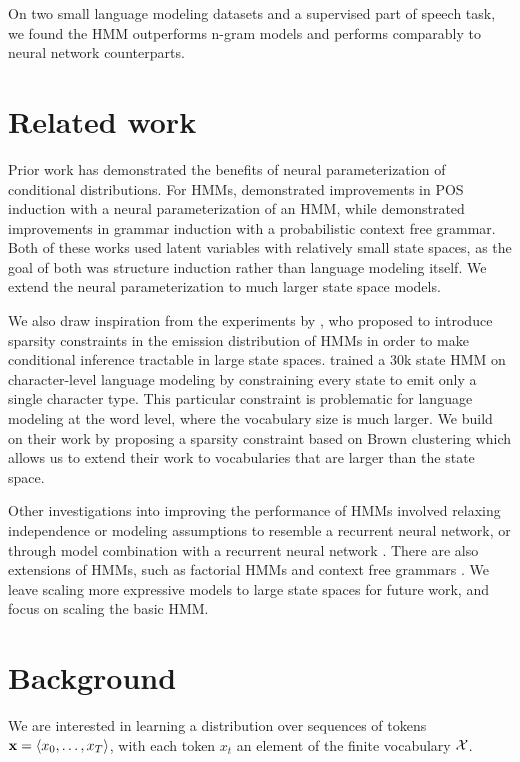 \documentclass[11pt,a4paper]{article}
\begin{document}
On two small language modeling datasets and a supervised part of speech task,
we found the HMM outperforms n-gram models and performs comparably to
neural network counterparts.

\section{Related work}

Prior work has demonstrated the benefits of neural parameterization of conditional distributions. 
For HMMs, \citet{tran2016hmm} demonstrated improvements in POS induction with a
neural parameterization of an HMM,
while \citet{kim2019cpcfg} demonstrated improvements in grammar induction with
a probabilistic context free grammar.
Both of these works used latent variables with relatively small state spaces,
as the goal of both was structure induction rather than language modeling itself.
We extend the neural parameterization to much larger state space models.

We also draw inspiration from the experiments by \citet{dedieu2019learning},
who proposed to introduce sparsity constraints in the 
emission distribution of HMMs in order to make conditional inference
tractable in large state spaces.
\citet{dedieu2019learning} trained a 30k state HMM on character-level language modeling
by constraining every state to emit only a single character type.
This particular constraint is problematic for language modeling at the word level,
where the vocabulary size is much larger.
We build on their work by proposing a sparsity constraint based on
Brown clustering \citep{brown1992} which allows us to extend their
work to vocabularies that are larger than the state space.

Other investigations into improving the performance of HMMs
involved relaxing independence or modeling assumptions \citep{buys2018hmm}
to resemble a recurrent neural network, or through model combination
with a recurrent neural network \citep{krakovna2016hmm}.
There are also extensions of HMMs, such as factorial HMMs \citet{zoubin1997fhmm,nepal2013fhmm}
and context free grammars \citep{kim2019cpcfg}.
We leave scaling more expressive models to large state spaces for future work,
and focus on scaling the basic HMM.

\section{Background}
We are interested in learning a distribution over sequences of tokens
$\mathbf{x} = \langle x_0, \ldots, x_T \rangle$, with each token $x_t$
an element of the finite vocabulary $\mathcal{X}$.
\end{document}

